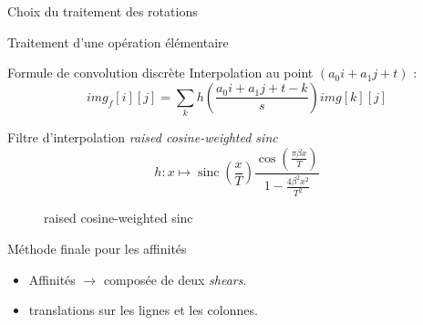 \documentclass[c,12pt]{beamer}
\newcommand{\ra}[0]{\rightarrow}
\DeclareMathOperator{\sinc}{sinc}
\begin{document}
\begin{frame}{Choix du traitement des rotations}
\begin{frame}{Traitement d'une opération élémentaire}
\begin{block}{Formule de convolution discrète}
Interpolation au point $ (a_0i+a_1j+t)$ :
	\begin{equation*}
	img_f[i][j] = \displaystyle{\sum_k}h\left(\frac{a_0i+a_1j+t-k}{s}\right)img[k][j]
	\label{formule_convolution_discrete}
	\end{equation*}

\end{block}


\begin{block}{Filtre d'interpolation }
	 \emph{raised cosine-weighted sinc}
	\begin{equation*}
	h : x \mapsto \sinc(\frac{x}{T})\frac{\cos(\frac{\pi\beta x}{T})}{1-\frac{4\beta^2x^2}{T^2}}
	\label{szeliski_definition_raisedCosineWeightedSinc}
	\end{equation*}
\end{block}

\end{frame}

\begin{figure}
\centering
{}
\caption{raised cosine-weighted sinc}
\end{figure}


\begin{frame}{Méthode finale pour les affinités}
\begin{itemize}
\item Affinités $\ra$ composée de deux \emph{shears}.
\item translations sur les lignes et les colonnes.
\end{itemize}


\end{frame}
\end{frame}
\end{document}
